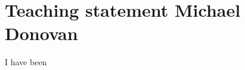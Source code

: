 \documentclass[11pt]{article}
\theoremstyle{plain}
\begin{document}
\section*{\huge Teaching statement \hfill\normalsize Michael Donovan}

I have been 
\end{document}
